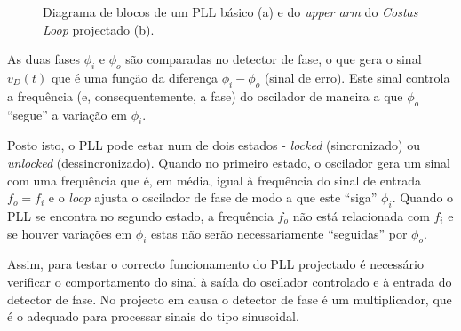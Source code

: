 \documentclass[11pt]{article}
\numberwithin{equation}{section}
\begin{document}
\begin{figure}[H]
	\centering
	\hspace{8mm}
	\vspace{-0.8em}
	\caption{Diagrama de blocos de um PLL básico (a) e do \textit{upper arm} do \textit{Costas Loop} projectado (b).}
	\vspace{-0.8em}
\end{figure}

As duas fases $\phi_{i}$ e $\phi_{o}$ são comparadas no detector de fase, o que gera o sinal $v_{D}\left(t\right)$ que é uma função da diferença $\phi_{i} - \phi_{o}$ (sinal de erro). Este sinal controla a frequência (e, consequentemente, a fase) do oscilador de maneira a que $\phi_{o}$ ``segue'' a variação em $\phi_{i}$.

Posto isto, o PLL pode estar num de dois estados - \textit{locked} (sincronizado) ou \textit{unlocked} (dessincronizado). Quando no primeiro estado, o oscilador gera um sinal com uma frequência que é, em média, igual à frequência do sinal de entrada $f_o = f_i$ e o \textit{loop} ajusta o oscilador de fase de modo a que este ``siga'' $\phi_{i}$. Quando o PLL se encontra no segundo estado, a frequência $f_o$ não está relacionada com $f_i$ e se houver variações em $\phi_{i}$ estas não serão necessariamente ``seguidas'' por $\phi_{o}$.

Assim, para testar o correcto funcionamento do PLL projectado é necessário verificar o comportamento do sinal à saída do oscilador controlado e à entrada do detector de fase. No projecto em causa o detector de fase é um multiplicador, que é o adequado para processar sinais do tipo sinusoidal. 
\end{document}
